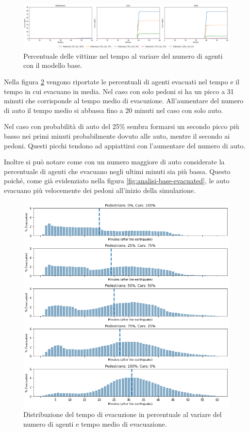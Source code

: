 \begin{figure}[ht]
    \centering
    \includegraphics[width=\textwidth]{images/analisi/base-casualties.png}
    \caption{
        Percentuale delle vittime nel tempo al variare del numero di agenti con il modello base.
    }
    \label{fig:analisi-base-casualties}
\end{figure}

Nella figura \ref{fig:analisi-base-evtimes} vengono riportate le percentuali di agenti evacuati nel tempo e il tempo in cui evacuano in media.
%
Nel caso con solo pedoni si ha un picco a 31 minuti che corrisponde al tempo medio di evacuzione.
All'aumentare del numero di auto il tempo medio si abbassa fino a 20 minuti nel caso con solo auto.

Nel caso con probabilità di auto del 25\% sembra formarsi un secondo picco più basso nei primi minuti probabilmente dovuto alle auto, mentre il secondo ai pedoni.
Questi picchi tendono ad appiattirsi con l'aumentare del numero di auto.


Inoltre si può notare come con un numero maggiore di auto considerate la percentuale di agenti che evacuano negli ultimi minuti sia più bassa.
Questo poiché, come già evidenziato nella figura \ref{fig:analisi-base-evacuated}, le auto evacuano più velocemente dei pedoni all'inizio della simulazione.

\begin{figure}
    \centering
    \includegraphics[width=\textwidth]{images/analisi/base-evtimes.png}
    \caption{
        Distribuzione del tempo di evacuzione in percentuale al variare del numero di agenti e tempo medio di evacuazione.
    }
    \label{fig:analisi-base-evtimes}
\end{figure}

